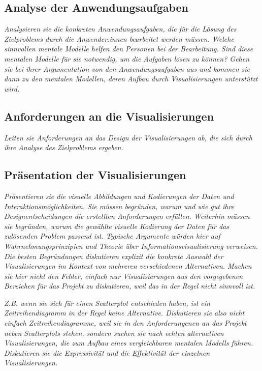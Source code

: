 \documentclass[usegeometry=true]{scrartcl}
\begin{document}
\subsection{Analyse der Anwendungsaufgaben}
\textit{Analysieren sie die konkreten Anwendungsaufgaben, die für die Lösung des Zielproblems durch die Anwender:innen bearbeitet werden müssen. 
Welche sinnvollen mentale Modelle helfen den Personen bei der Bearbeitung. 
Sind diese mentalen Modelle für sie notwendig, um die Aufgaben lösen zu können? Gehen sie bei ihrer Argumentation von den Anwendungsaufgaben aus und kommen sie dann zu den mentalen Modellen, deren Aufbau durch Visualisierungen unterstützt wird. 
}

\subsection{Anforderungen an die Visualisierungen}
\textit{Leiten sie Anforderungen an das Design der Visualisierungen ab, die sich durch ihre Analyse des Zielproblems ergeben.
}

\subsection{Präsentation der Visualisierungen}
\textit{Präsentieren sie die visuelle Abbildungen und Kodierungen der Daten und Interaktionsmöglichkeiten. 
Sie müssen  begründen, warum und wie gut ihre Designentscheidungen die erstellten Anforderungen erfüllen. 
Weiterhin müssen sie begründen, warum die gewählte visuelle Kodierung der Daten für das zulösenden Problem passend ist.
Typische Argumente würden hier auf Wahrnehmungsprinzipien und Theorie über Informationsvisualisierung verweisen. 
Die besten Begründungen diskutieren explizit die konkrete Auswahl der Visualisierungen im Kontext von mehreren verschiedenen Alternativen. 
Machen sie hier nicht den Fehler, einfach nur Visualisierungen aus den vorgegebenen Bereichen für das Projekt zu diskutieren, weil das in der Regel nicht sinnvoll ist.
}

\textit{Z.B. wenn sie sich für einen Scatterplot entschieden haben, ist ein Zeitreihendiagramm in der Regel keine Alternative.
Diskutieren sie also nicht einfach Zeitreihendiagramme, weil sie in den Anforderungenen an das Projekt neben Scatterplots stehen, sondern suchen sie nach echten alternativen Visualisierungen, die zum Aufbau eines vergleichbaren mentalen Modells führen. 
Diskutieren sie die Expressivität und die Effektivität der einzelnen Visualisierungen. 
}
\end{document}
